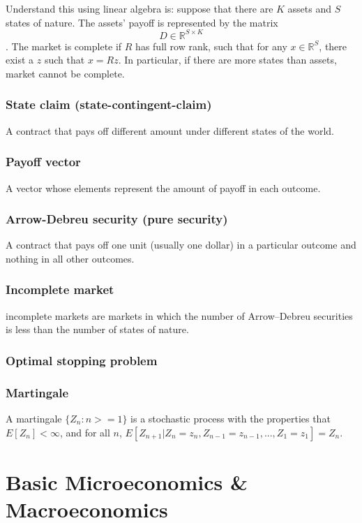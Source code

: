 \documentclass[a4paper,13pt]{report}
\newcommand{\R}{\mathbb{R}}
\begin{document}
Understand this using linear algebra is: suppose that there are $K$ assets and $S$ states of nature. The assets' payoff is represented by the matrix $$D\in \R^{S\times K}$$. The market is complete if $R$ has full row rank, such that for any $x \in \R^S$, there exist a $z$ such that $x=Rz$. In particular, if there are more states than assets, market cannot be complete.

\subsection{State claim (state-contingent-claim)}
A contract that pays off different amount under different states of the world.


\subsection{Payoff vector}
A vector whose elements represent the amount of payoff in each outcome.

\subsection{Arrow-Debreu security (pure security)}
A contract that pays off one unit (usually one dollar) in a particular outcome and nothing in all other outcomes.

\subsection{Incomplete market}
incomplete markets are markets in which the number of Arrow–Debreu securities is less than the number of states of nature.






\subsection{Optimal stopping problem}

\subsection{Martingale}
A martingale $\{Z_n:n>=1\}$ is a stochastic process with the properties that $E[Z_n]<\infty$, and for all $n$, $E[Z_{n+1}|Z_n=z_n,Z_{n-1}=z_{n-1},...,Z_1=z_1] = Z_n$.\cite{zhou2008practical}

\chapter{Basic Microeconomics \& Macroeconomics}
\end{document}
